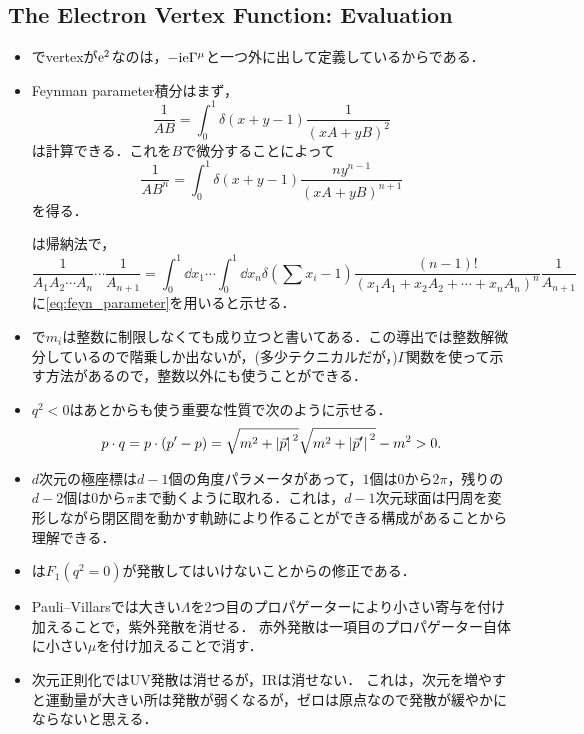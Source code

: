 \subsection{The Electron Vertex Function: Evaluation}
\begin{itemize}
	\item {}でvertexが$\mathrm{e}^2$なのは，$-\mathrm{i}\mathrm{e}\Gamma^{\mu}$と一つ外に出して定義しているからである．
	\item Feynman parameter積分はまず，
		\begin{equation}
			\frac{1}{AB} = \int_0^1 \delta(x+y-1) \frac{1}{(xA+yB)^2}
		\end{equation}
		は計算できる．これを$B$で微分することによって
		\begin{equation}
			\frac{1}{AB^n} = \int_0^1\delta(x+y-1)\frac{ny^{n-1}}{(xA+yB)^{n+1}}\label{eq:feyn_parameter}
		\end{equation}
		を得る．
		
		は帰納法で，
		\begin{equation}
			\frac{1}{A_1A_2\cdots A_n}\cdots\frac{1}{A_{n+1}} 
			= \int_0^1\dd{x_1}\cdots\int_0^1\dd{x_n}\delta(\sum x_i-1)\frac{(n-1)!}{(x_1A_1 + x_2A_2 + \cdots + x_nA_n)^n}\frac{1}{A_{n+1}}
		\end{equation}
		に\eqref{eq:feyn_parameter}を用いると示せる．
	\item {}で$m_i$は整数に制限しなくても成り立つと書いてある．この導出では整数解微分しているので階乗しか出ないが，(多少テクニカルだが，)$\Gamma$関数を使って示す方法があるので，整数以外にも使うことができる．

	\item $q^2<0$はあとからも使う重要な性質で次のように示せる．
		\begin{equation}
			p\cdot q = p\cdot (p'-p) = \sqrt{m^2 + \abs*{\vec{p}}^2}\sqrt{m^2 + \abs*{\vec{p}'}^2} - m^2 > 0.
		\end{equation}
	\item $d$次元の極座標は$d-1$個の角度パラメータがあって，$1$個は$0$から$2\pi$，残りの$d-2$個は$0$から$\pi$まで動くように取れる．これは，$d-1$次元球面は円周を変形しながら閉区間を動かす軌跡により作ることができる構成があることから理解できる．
	\item {}は$F_1(q^2=0)$が発散してはいけないことからの修正である．
	\item Pauli--Villarsでは大きい$\Lambda$を2つ目のプロパゲーターにより小さい寄与を付け加えることで，紫外発散を消せる．
		赤外発散は一項目のプロパゲーター自体に小さい$\mu$を付け加えることで消す．
	\item 次元正則化ではUV発散は消せるが，IRは消せない．
		これは，次元を増やすと運動量が大きい所は発散が弱くなるが，ゼロは原点なので発散が緩やかにならないと思える．
\end{itemize}
